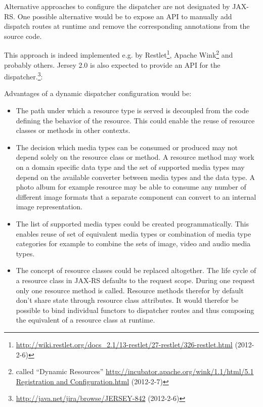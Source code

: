 \documentclass[12pt,a4paper]{scrartcl}		%
\newcommand{\citeurl}[2]{\url{#1} (#2)}
\begin{document}
Alternative approaches to configure the dispatcher are not designated by
JAX-RS. One possible alternative would be to expose an API to manually add
dispatch routes at runtime and remove the corresponding annotations from the
source code. 

This approach is indeed implemented e.g. by
Restlet\footnote{\citeurl{http://wiki.restlet.org/docs_2.1/13-restlet/27-restlet/326-restlet.html}{2012-2-6}},
Apache Wink\footnote{called ``Dynamic Resources''
  \citeurl{http://incubator.apache.org/wink/1.1/html/5.1 Registration and
    Configuration.html}{2012-2-7}} and probably others. Jersey 2.0 is also
expected to provide an API for the
dispatcher.\footnote{\citeurl{http://java.net/jira/browse/JERSEY-842}{2012-2-6}}:

Advantages of a dynamic dispatcher configuration would be:

\begin{itemize}
\item The path under which a resource type is served is decoupled from the code
  defining the behavior of the resource. This could enable the reuse of resource
  classes or methods in other contexts.
\item The decision which media types can be consumed or produced may not depend
  solely on the resource class or method. A resource method may work on a domain
  specific data type and the set of supported media types may depend on the
  available converter between media types and the data type. A photo album for example
  resource may be able to consume any number of different image formats that
  a separate component can convert to an internal image representation.
\item The list of supported media types could be created programmatically. This
  enables reuse of set of equivalent media types or combination of media type
  categories for example to combine the sets of image, video and audio media
  types.
\item The concept of resource classes could be replaced altogether. The life
  cycle of a resource class in JAX-RS defaults to the request scope. During one
  request only one resource method is called. Resource methods therefor by
  default don't share state through resource class attributes. It would therefor
  be possible to bind individual functors to dispatcher routes and thus
  composing the equivalent of a resource class at runtime.
\end{itemize}

\end{document}
